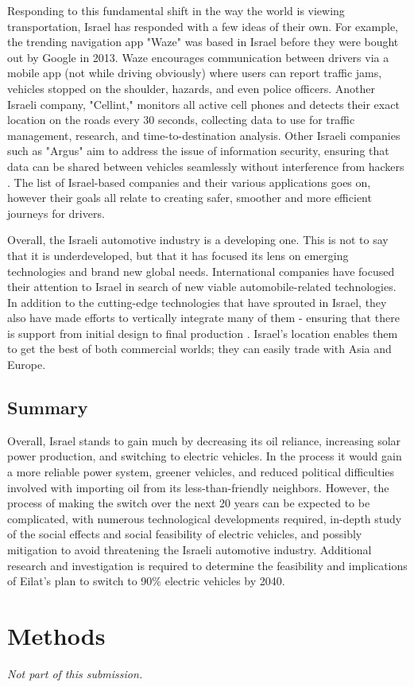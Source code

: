 \documentclass{report}                         %
\begin{document}
Responding to this fundamental shift in the way the world is viewing transportation, Israel has responded with a few ideas of their own. For example, the trending navigation app "Waze" was based in Israel before they were bought out by Google in 2013. Waze encourages communication between drivers via a mobile app (not while driving obviously) where users can report traffic jams, vehicles stopped on the shoulder, hazards, and even police officers. Another Israeli company, "Cellint," monitors all active cell phones and detects their exact location on the roads every 30 seconds, collecting data to use for traffic management, research, and time-to-destination analysis. Other Israeli companies such as "Argus" aim to address the issue of information security, ensuring that data can be shared between vehicles seamlessly without interference from hackers \cite{MinistryofEconomyandIndustryStateofIsraelTheIsrael}. The list of Israel-based companies and their various applications goes on, however their goals all relate to creating safer, smoother and more efficient journeys for drivers.

Overall, the Israeli automotive industry is a developing one. This is not to say that it is underdeveloped, but that it has focused its lens on emerging technologies and brand new global needs. International companies have focused their attention to Israel in search of new viable automobile-related technologies. In addition to the cutting-edge technologies that have sprouted in Israel, they also have made efforts to vertically integrate many of them - ensuring that there is support from initial design to final production \cite{MinistryofEconomyandIndustryStateofIsraelTheIsrael}. Israel's location enables them to get the best of both commercial worlds; they can easily trade with Asia and Europe.

\section{Summary}

Overall, Israel stands to gain much by decreasing its oil reliance, increasing solar power production, and switching to electric vehicles. In the process it would gain a more reliable power system, greener vehicles, and reduced political difficulties involved with importing oil from its less-than-friendly neighbors. However, the process of making the switch over the next 20 years can be expected to be complicated, with numerous technological developments required, in-depth study of the social effects and social feasibility of electric vehicles, and possibly mitigation to avoid threatening the Israeli automotive industry. Additional research and investigation is required to determine the feasibility and implications of Eilat's plan to switch to 90\% electric vehicles by 2040.\

\newpage
\chapter{Methods}
\textit{Not part of this submission.}

\newpage
\bigskip


\end{document}
